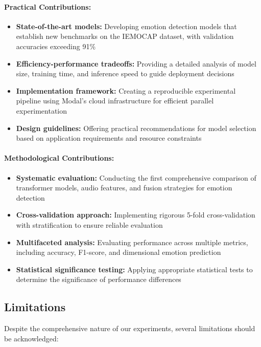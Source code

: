 \documentclass[12pt]{article}
\begin{document}
\paragraph{Practical Contributions:}
\begin{itemize}
    \item \textbf{State-of-the-art models:} Developing emotion detection models that establish new benchmarks on the IEMOCAP dataset, with validation accuracies exceeding 91\%
    
    \item \textbf{Efficiency-performance tradeoffs:} Providing a detailed analysis of model size, training time, and inference speed to guide deployment decisions
    
    \item \textbf{Implementation framework:} Creating a reproducible experimental pipeline using Modal's cloud infrastructure for efficient parallel experimentation
    
    \item \textbf{Design guidelines:} Offering practical recommendations for model selection based on application requirements and resource constraints
\end{itemize}

\paragraph{Methodological Contributions:}
\begin{itemize}
    \item \textbf{Systematic evaluation:} Conducting the first comprehensive comparison of transformer models, audio features, and fusion strategies for emotion detection
    
    \item \textbf{Cross-validation approach:} Implementing rigorous 5-fold cross-validation with stratification to ensure reliable evaluation
    
    \item \textbf{Multifaceted analysis:} Evaluating performance across multiple metrics, including accuracy, F1-score, and dimensional emotion prediction
    
    \item \textbf{Statistical significance testing:} Applying appropriate statistical tests to determine the significance of performance differences
\end{itemize}

\subsection{Limitations}
Despite the comprehensive nature of our experiments, several limitations should be acknowledged:
\end{document}

